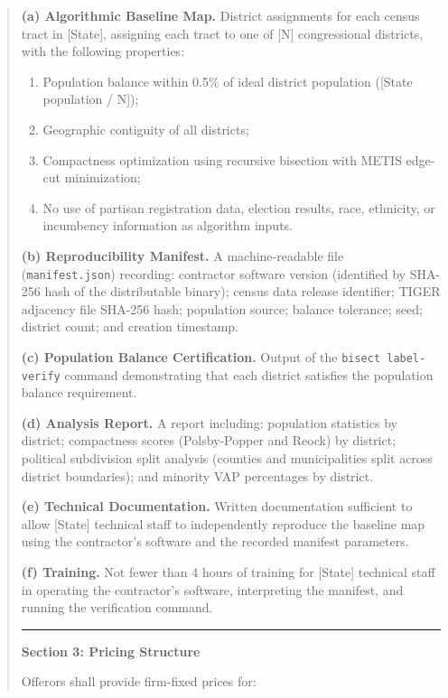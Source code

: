 \begin{quote}
\textbf{(a) Algorithmic Baseline Map.} District assignments for each census tract in [State], assigning each tract to one of [N] congressional districts, with the following properties:
  \begin{enumerate}[label=(\roman*)]
    \item Population balance within 0.5\% of ideal district population ([State population / N]);
    \item Geographic contiguity of all districts;
    \item Compactness optimization using recursive bisection with METIS edge-cut minimization;
    \item No use of partisan registration data, election results, race, ethnicity, or incumbency information as algorithm inputs.
  \end{enumerate}

\textbf{(b) Reproducibility Manifest.} A machine-readable file (\texttt{manifest.json}) recording: contractor software version (identified by SHA-256 hash of the distributable binary); census data release identifier; TIGER adjacency file SHA-256 hash; population source; balance tolerance; seed; district count; and creation timestamp.

\textbf{(c) Population Balance Certification.} Output of the \texttt{bisect label-verify} command demonstrating that each district satisfies the population balance requirement.

\textbf{(d) Analysis Report.} A report including: population statistics by district; compactness scores (Polsby-Popper and Reock) by district; political subdivision split analysis (counties and municipalities split across district boundaries); and minority VAP percentages by district.

\textbf{(e) Technical Documentation.} Written documentation sufficient to allow [State] technical staff to independently reproduce the baseline map using the contractor's software and the recorded manifest parameters.

\textbf{(f) Training.} Not fewer than 4 hours of training for [State] technical staff in operating the contractor's software, interpreting the manifest, and running the verification command.

\rule{\linewidth}{0.4pt}

\textbf{Section 3: Pricing Structure}

Offerors shall provide firm-fixed prices for:


\end{quote}
